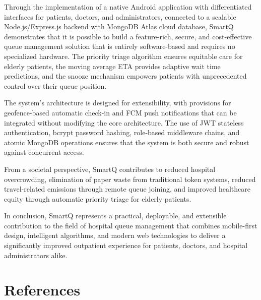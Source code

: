 \documentclass[12pt,a4paper]{article}
\begin{document}
Through the implementation of a native Android application with differentiated interfaces for patients, doctors, and administrators, connected to a scalable Node.js/Express.js backend with MongoDB Atlas cloud database, SmartQ demonstrates that it is possible to build a feature-rich, secure, and cost-effective queue management solution that is entirely software-based and requires no specialized hardware. The priority triage algorithm ensures equitable care for elderly patients, the moving average ETA provides adaptive wait time predictions, and the snooze mechanism empowers patients with unprecedented control over their queue position.

The system's architecture is designed for extensibility, with provisions for geofence-based automatic check-in and FCM push notifications that can be integrated without modifying the core architecture. The use of JWT stateless authentication, bcrypt password hashing, role-based middleware chains, and atomic MongoDB operations ensures that the system is both secure and robust against concurrent access.

From a societal perspective, SmartQ contributes to reduced hospital overcrowding, elimination of paper waste from traditional token systems, reduced travel-related emissions through remote queue joining, and improved healthcare equity through automatic priority triage for elderly patients.

In conclusion, SmartQ represents a practical, deployable, and extensible contribution to the field of hospital queue management that combines mobile-first design, intelligent algorithms, and modern web technologies to deliver a significantly improved outpatient experience for patients, doctors, and hospital administrators alike.

\section*{References}
\end{document}
